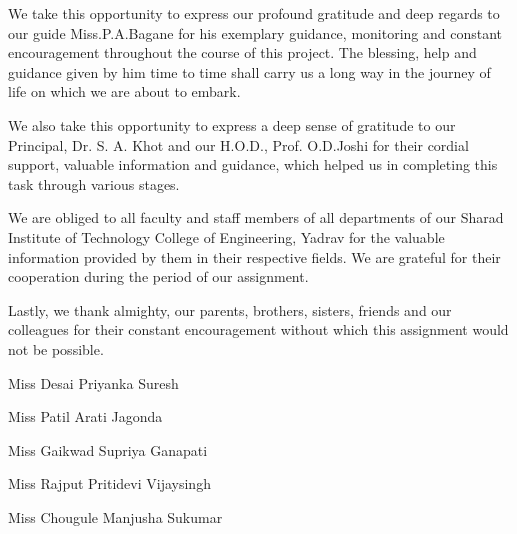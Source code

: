 \documentclass[a4paper, 11pt, oneside]{Thesis}  %
\begin{document}
{{We take this opportunity to express our profound gratitude and deep regards to our guide Miss.P.A.Bagane for his exemplary guidance, monitoring and constant encouragement throughout the course of this project. The blessing, help and guidance given by him time to time shall carry us a long way in the journey of life on which we are about to embark.

We also take this opportunity to express a deep sense of gratitude to our Principal, Dr. S. A. Khot and our H.O.D., Prof. O.D.Joshi for their cordial support, valuable information and guidance, which helped us in completing this task through various stages.

We are obliged to all faculty and staff members of all departments of our Sharad Institute of Technology College of Engineering, Yadrav for the valuable information provided by them in their respective fields. We are grateful for their cooperation during the period of our assignment.

Lastly, we thank almighty, our parents, brothers, sisters, friends and our colleagues for their constant encouragement without which this assignment would not be possible.

\begin{flushright}
\raggedright 

Miss Desai Priyanka Suresh

Miss Patil Arati Jagonda

Miss Gaikwad Supriya Ganapati				

Miss Rajput Pritidevi Vijaysingh

Miss Chougule Manjusha Sukumar

\end{flushright}

}
\clearpage  %

\pagestyle{fancy}  %


\tableofcontents  %

\listoffigures  %

}
\end{document}
